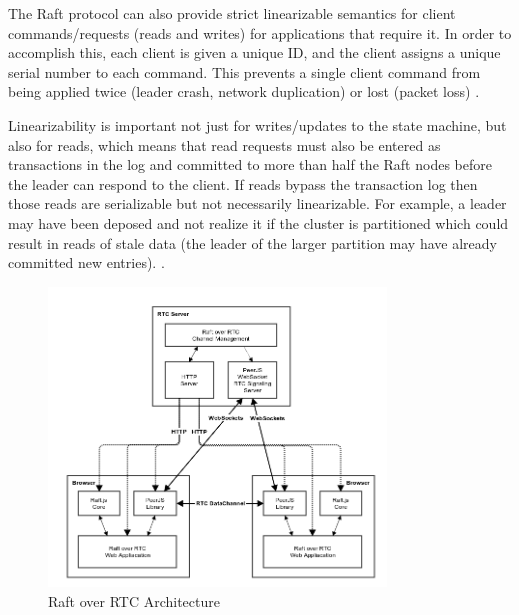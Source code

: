 \documentclass[9pt]{extarticle}
\begin{document}
\begin{multicols}{2}
The Raft protocol can also provide strict linearizable semantics for
client commands/requests (reads and writes) for applications that
require it. In order to accomplish this, each client is given a unique
ID, and the client assigns a unique serial number to each command.
This prevents a single client command from being applied twice (leader
crash, network duplication) or lost (packet loss)
\cite[Section~6.3]{raft_thesis:ongaro14}.

Linearizability is important not just for writes/updates to the state
machine, but also for reads, which means that read requests must also
be entered as transactions in the log and committed to more than half
the Raft nodes before the leader can respond to the client. If reads
bypass the transaction log then those reads are serializable but not
necessarily linearizable. For example, a leader may have been deposed
and not realize it if the cluster is partitioned which could result in
reads of stale data (the leader of the larger partition may have
already committed new entries).
\cite[Section~6.4]{raft_thesis:ongaro14}.

\end{multicols}

\begin{figure}[h]
\centerline{\includegraphics[width=0.8\textwidth]{imgs/raft_rtc_architecture}}
\caption{Raft over RTC Architecture}
  \label{fig:raft_rtc_architecture}
\end{figure}
\end{document}

